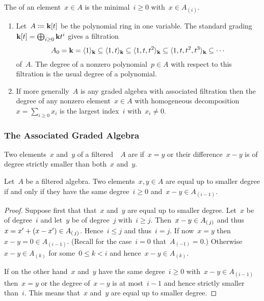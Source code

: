 \begin{definition}
  The  of an element~$x \in A$ is the minimal~$i \geq 0$ with~$x \in A_{(i)}$.
\end{definition}


\begin{example}
  \leavevmode
  \begin{enumerate}
    \item
      Let~$A \coloneqq \mathbf{k}[t]$ be the polynomial ring in one variable.
      The standard grading~$\mathbf{k}[t] = \bigoplus_{i \geq 0} \mathbf{k} t^i$ gives a filtration
      \[
        A_0
        =
        \mathbf{k}
        =
        \langle 1 \rangle_{\mathbf{k}}
        \subseteq
        \langle 1, t \rangle_{\mathbf{k}}
        \subseteq
        \langle 1, t, t^2 \rangle_{\mathbf{k}}
        \subseteq
        \langle 1, t, t^2, t^3 \rangle_{\mathbf{k}}
        \subseteq
        \dotsb
      \]
      of~$A$.
      The degree of a nonzero polynomial~$p \in A$ with respect to this filtration is the usual degree of a polynomial.
    \item
      If more generally~$A$ is any graded algebra with associated filtration then the degree of any nonzero element~$x \in A$ with homogeneous decomposition~$x = \sum_{i \geq 0} x_i$ is the largest index~$i$ with~$x_i \neq 0$.
  \end{enumerate}
\end{example}


\subsubsection{The Associated Graded Algebra}


\begin{definition}
  Two elements~$x$ and~$y$ of a filtered~{\algebra{$\kf$}}~$A$ are  if~$x = y$ or their difference~$x - y$ is of degree strictly smaller than both~$x$ and~$y$.
\end{definition}


\begin{lemma}
  Let~$A$ be a filtered algebra.
  Two elements~$x, y \in A$ are equal up to smaller degree if and only if they have the same degree~$i \geq 0$ and~$x - y \in A_{(i-1)}$.
\end{lemma}


\begin{proof}
  Suppose first that that~$x$ and~$y$ are equal up to smaller degree.
  Let~$x$ be of degree~$i$ and let~$y$ be of degree~$j$ with~$i \geq j$.
  Then~$x - y \in A_{(\, j)}$ and thus~$x = x' + (x- x') \in A_{(\, j)}$.
  Hence~$i \leq j$ and thus~$i = j$.  
  If now~$x = y$ then~$x - y = 0 \in A_{(i-1)}$.
  (Recall for the case~$i = 0$ that~$A_{(-1)} = 0$.)
  Otherwise~$x - y \in A_{(k)}$ for some~$0 \leq k < i$ and hence~$x - y \in A_{(k)}$.
  
  If on the other hand~$x$ and~$y$ have the same degree~$i \geq 0$ with~$x - y \in A_{(i-1)}$ then~$x = y$ or the degree of~$x - y$ is at most~$i-1$ and hence strictly smaller than~$i$.
  This means that~$x$ and~$y$ are equal up to smaller degree.
\end{proof}


